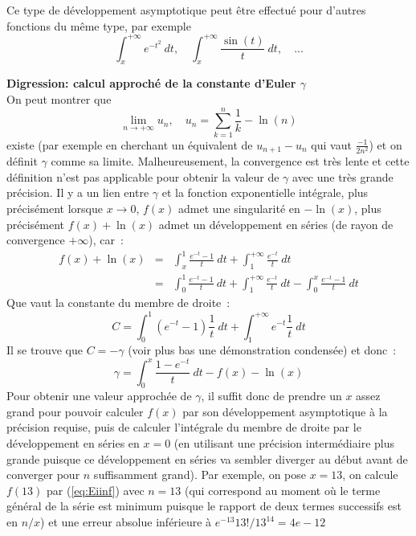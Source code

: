 \documentclass[a4paper,11pt]{article}
\begin{document}
\begin{giacjshere}
Ce type de d\'eveloppement asymptotique peut \^etre effectu\'e pour
d'autres fonctions du m\^eme type, par exemple
\[ \int_x^{+\infty} e^{-t^2} \ dt, \quad \int_x^{+\infty} \frac{\sin(t)}{t} \ dt, \quad ... \]


{\bf Digression: calcul approché de la constante d'Euler
  $\gamma$}\\
On peut montrer que
\begin{equation} \label{eq:def_gamma}
 \lim_{n\rightarrow +\infty} u_n, \quad u_n=\sum_{k=1}^{n}\frac{1}{k} - \ln(n) 
\end{equation}
existe (par exemple en cherchant un \'equivalent de $u_{n+1}-u_n$ qui vaut 
$\frac{-1}{2n^2}$)
et on définit $\gamma$ comme sa limite. Malheureusement, la convergence
est très lente et cette définition n'est pas applicable pour obtenir la valeur
de $\gamma$ avec une très grande précision.
Il y a un lien entre $\gamma$ et la fonction exponentielle intégrale, plus précisément
lorsque $x\rightarrow 0$, $f(x)$ admet une singularité en $-\ln(x)$,
plus précisément $f(x)+\ln(x)$
admet un développement en séries (de rayon de convergence $+\infty$), car~:
\begin{eqnarray*}
 f(x)+\ln(x)&=&\int_x^{1}\frac{e^{-t}-1}{t} \ dt + \int_1^{+\infty} \frac{e^{-t}}{t} \ dt \\
&=& \int_0^{1}\frac{e^{-t}-1}{t} \ dt + \int_1^{+\infty} \frac{e^{-t}}{t} \ dt
- \int_0^{x} \frac{e^{-t}-1}{t} \ dt
\end{eqnarray*}
Que vaut la constante du membre de droite~:
\[ C=\int_0^{1}(e^{-t}-1)\frac{1}{t} \ dt + \int_1^{+\infty} e^{-t} \frac{1}{t} \ dt \]
Il se trouve que $C=-\gamma$ (voir plus bas une démonstration condensée) et donc~:
\begin{equation} \label{eq:gamma}
 \gamma= \int_0^{x} \frac{1-e^{-t}}{t} \ dt -f(x)-\ln(x)
\end{equation}
Pour obtenir une valeur approchée de $\gamma$, il suffit donc de prendre un $x$ assez grand
pour pouvoir calculer $f(x)$ par son développement asymptotique à la précision requise,
puis de calculer l'intégrale du membre de droite par le développement en séries en $x=0$
(en utilisant une précision intermédiaire plus grande puisque ce développement en séries
va sembler diverger au début avant de converger pour $n$ suffisamment grand).
Par exemple, on pose $x=13$, on calcule $f(13)$ par (\ref{eq:Eiinf})
avec $n=13$ (qui correspond au moment o\`u le terme g\'en\'eral
de la s\'erie est minimum puisque le rapport de deux termes successifs
est en $n/x$)
et une erreur absolue inf\'erieure \`a $e^{-13} 13!/13^{14}=4e-12$

\end{giacjshere}
\end{document}
